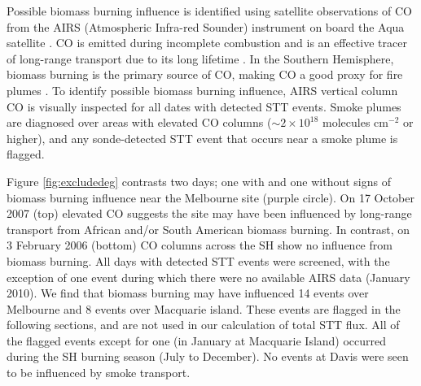 \documentclass[acp, manuscript]{copernicus} %
\begin{document}
    Possible biomass burning influence is identified using satellite observations of CO from the AIRS (Atmospheric Infra-red Sounder) instrument on board the Aqua satellite \citep{AIRS3STD}.
    CO is emitted during incomplete combustion and is an effective tracer of long-range transport due to its long lifetime \citep{Edwards2003, Edwards2006}.
    In the Southern Hemisphere, biomass burning is the primary source of CO, making CO a good proxy for fire plumes \citep[e.g.][]{Sinha2004, Mari2008}.
    To identify possible biomass burning influence, AIRS vertical column CO is visually inspected for all dates with detected STT events.
    Smoke plumes are diagnosed over areas with elevated CO columns ($\sim 2 \times 10^{18}$ molecules cm$^{-2}$ or higher), and any sonde-detected STT event that occurs near a smoke plume is flagged.

    Figure \ref{fig:excludedeg} contrasts two days; one with and one without signs of biomass burning influence near the Melbourne site (purple circle).
    On 17 October 2007 (top) elevated CO suggests the site may have been influenced by long-range transport from African and/or South American biomass burning.
    In contrast, on 3 February 2006 (bottom) CO columns across the SH show no influence from biomass burning.
    All days with detected STT events were screened, with the exception of one event during which there were no available AIRS data (January 2010).
    We find that biomass burning may have influenced 14 events over Melbourne and 8 events over Macquarie island.
    These events are flagged in the following sections, and are not used in our calculation of total STT flux.
    All of the flagged events except for one (in January at Macquarie Island) occurred during the SH burning season (July to December). %
    No events at Davis were seen to be influenced by smoke transport.
    
\end{document}
